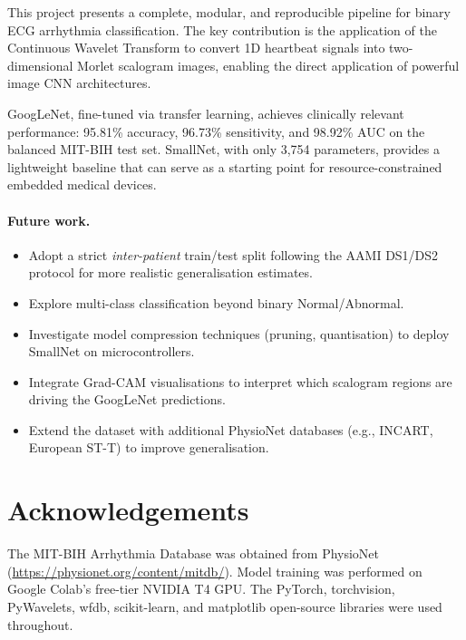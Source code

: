 \documentclass[12pt,a4paper]{article}
\begin{document}
This project presents a complete, modular, and reproducible pipeline for binary
ECG arrhythmia classification.  The key contribution is the application of the
Continuous Wavelet Transform to convert 1D heartbeat signals into
two-dimensional Morlet scalogram images, enabling the direct application of
powerful image CNN architectures.

GoogLeNet, fine-tuned via transfer learning, achieves clinically relevant
performance: 95.81\% accuracy, 96.73\% sensitivity, and 98.92\% AUC on the
balanced MIT-BIH test set.  SmallNet, with only 3,754 parameters, provides a
lightweight baseline that can serve as a starting point for resource-constrained
embedded medical devices.

\paragraph{Future work.}
\begin{itemize}[leftmargin=*]
    \item Adopt a strict \emph{inter-patient} train/test split following the
          AAMI DS1/DS2 protocol for more realistic generalisation estimates.
    \item Explore multi-class classification beyond binary Normal/Abnormal.
    \item Investigate model compression techniques (pruning, quantisation) to
          deploy SmallNet on microcontrollers.
    \item Integrate Grad-CAM visualisations to interpret which scalogram
          regions are driving the GoogLeNet predictions.
    \item Extend the dataset with additional PhysioNet databases (e.g.,
          INCART, European ST-T) to improve generalisation.
\end{itemize}

\section*{Acknowledgements}

\noindent
The MIT-BIH Arrhythmia Database was obtained from PhysioNet
(\url{https://physionet.org/content/mitdb/}).  Model training was performed
on Google Colab's free-tier NVIDIA T4 GPU.  The PyTorch, torchvision,
PyWavelets, wfdb, scikit-learn, and matplotlib open-source libraries were
used throughout.
\end{document}
